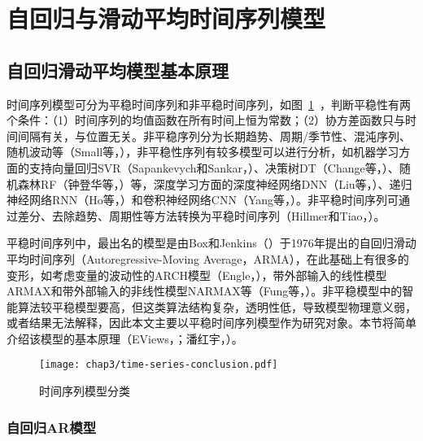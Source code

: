 \section{自回归与滑动平均时间序列模型}

\subsection{自回归滑动平均模型基本原理}

时间序列模型可分为平稳时间序列和非平稳时间序列，如图~\ref{fig:时间序列模型分类}~，判断平稳性有两个条件：（1）时间序列的均值函数在所有时间上恒为常数；（2）协方差函数只与时间间隔有关，与位置无关。非平稳序列分为长期趋势、周期/季节性、混沌序列、随机波动等（Small等，\citeyear{small2009transforming}），非平稳性序列有较多模型可以进行分析，如机器学习方面的支持向量回归SVR（Sapankevych和Sankar，\citeyear{sapankevych2009time}）、决策树DT（Change等，\citeyear{chang2011trend}）、随机森林RF（钟登华等，\citeyear{钟登华2018基于混沌时序}）等，深度学习方面的深度神经网络DNN（Liu等，\citeyear{liu2014deep}）、递归神经网络RNN（Ho等，\citeyear{ho2002comparative}）和卷积神经网络CNN（Yang等，\citeyear{yang2015deep}）。非平稳时间序列可通过差分、去除趋势、周期性等方法转换为平稳时间序列（Hillmer和Tiao，\citeyear{hillmer1982arima}）。

平稳时间序列中，最出名的模型是由Box和Jenkins（\citeyear{box2015time}）于1976年提出的自回归滑动平均时间序列（Autoregressive-Moving Average，ARMA），在此基础上有很多的变形，如考虑变量的波动性的ARCH模型（Engle，\citeyear{engle1982autoregressive}），带外部输入的线性模型ARMAX和带外部输入的非线性模型NARMAX等（Fung等，\citeyear{fung2003modelling}）。非平稳模型中的智能算法较平稳模型要高，但这类算法结构复杂，透明性低，导致模型物理意义弱，或者结果无法解释，因此本文主要以平稳时间序列模型作为研究对象。本节将简单介绍该模型的基本原理（EViews，\citeyear{noble2011eviews}；潘红宇，\citeyear{cryer2011时间序列分析及应用}）。

\begin{figure}[htb!]
    \centering
    \texttt{[image: chap3/time-series-conclusion.pdf]}
    \caption{时间序列模型分类}
    \label{fig:时间序列模型分类}
\end{figure}

\subsubsection{自回归AR模型}

